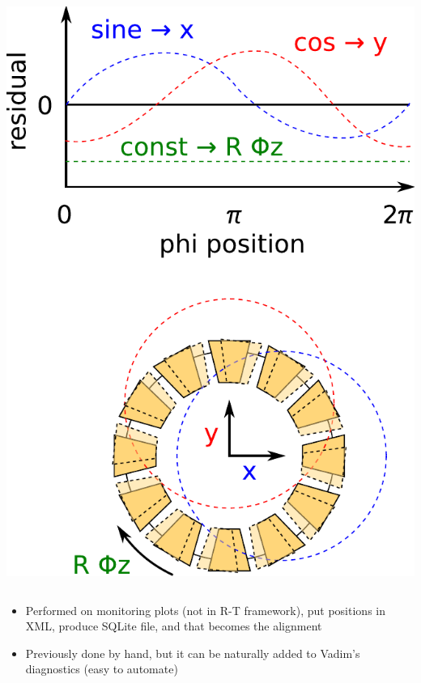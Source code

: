 \documentclass[compress]{beamer}
\begin{document}
\begin{frame}
\begin{columns}
\includegraphics[width=\linewidth]{tracker_disk_interpretation.pdf}
\end{columns}

\scriptsize
\begin{itemize}
\item Performed on monitoring plots (not in R-T framework), put positions in XML, produce SQLite file, and that becomes the alignment
\item Previously done by hand, but it can be naturally added to Vadim's diagnostics (easy to automate)
\end{itemize}
\end{frame}

\end{document}
